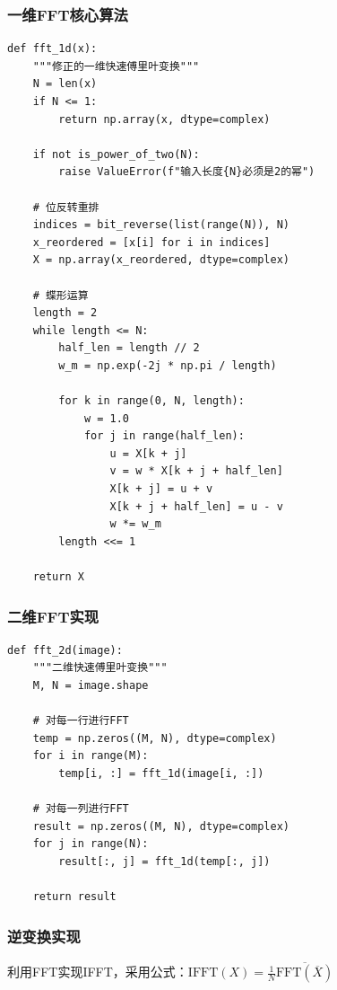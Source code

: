 \documentclass[a4paper]{article}
\begin{document}
\subsubsection{一维FFT核心算法}

\begin{lstlisting}
def fft_1d(x):
    """修正的一维快速傅里叶变换"""
    N = len(x)
    if N <= 1:
        return np.array(x, dtype=complex)
    
    if not is_power_of_two(N):
        raise ValueError(f"输入长度{N}必须是2的幂")
    
    # 位反转重排
    indices = bit_reverse(list(range(N)), N)
    x_reordered = [x[i] for i in indices]
    X = np.array(x_reordered, dtype=complex)
    
    # 蝶形运算
    length = 2
    while length <= N:
        half_len = length // 2
        w_m = np.exp(-2j * np.pi / length)
        
        for k in range(0, N, length):
            w = 1.0
            for j in range(half_len):
                u = X[k + j]
                v = w * X[k + j + half_len]
                X[k + j] = u + v
                X[k + j + half_len] = u - v
                w *= w_m
        length <<= 1
    
    return X
\end{lstlisting}

\subsubsection{二维FFT实现}

\begin{lstlisting}
def fft_2d(image):
    """二维快速傅里叶变换"""
    M, N = image.shape
    
    # 对每一行进行FFT
    temp = np.zeros((M, N), dtype=complex)
    for i in range(M):
        temp[i, :] = fft_1d(image[i, :])
    
    # 对每一列进行FFT
    result = np.zeros((M, N), dtype=complex)
    for j in range(N):
        result[:, j] = fft_1d(temp[:, j])
    
    return result
\end{lstlisting}

\subsubsection{逆变换实现}

利用FFT实现IFFT，采用公式：$\text{IFFT}(X) = \frac{1}{N}\overline{\text{FFT}(\overline{X})}$
\end{document}
